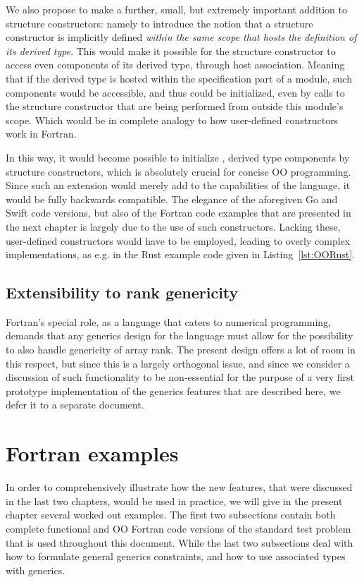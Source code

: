 \documentclass[11pt,oneside]{report}
\newcommand{\code}[1]{{\selectfont\ttfamily{#1}}}
\begin{document}
We also propose to make a further, small, but extremely important
addition to structure constructors: namely to introduce the notion
that a structure constructor is implicitly defined \emph{within the
same scope that hosts the definition of its derived type}. This would
make it possible for the structure constructor to access even
\code{private} components of its derived type, through host
association. Meaning that if the derived type is hosted within the
specification part of a module, such components would be accessible,
and thus could be initialized, even by calls to the structure
constructor that are being performed from outside this module's
scope. Which would be in complete analogy to how user-defined
constructors work in Fortran.

In this way, it would become possible to initialize \code{private},
\code{allocatable} derived type components by structure constructors,
which is absolutely crucial for concise OO programming. Since such an
extension would merely add to the capabilities of the language, it
would be fully backwards compatible. The elegance of the aforegiven
Go and Swift code versions, but also of the Fortran code examples that
are presented in the next chapter is largely due to the use of such
constructors. Lacking these, user-defined constructors would have to
be employed, leading to overly complex implementations, as e.g. in the
Rust example code given in Listing~\ref{lst:OORust}.


\section{Extensibility to rank genericity}

Fortran's special role, as a language that caters to numerical
programming, demands that any generics design for the language must
allow for the possibility to also handle genericity of array rank. The
present design offers a lot of room in this respect, but since this is
a largely orthogonal issue, and since we consider a discussion of such
functionality to be non-essential for the purpose of a very first
prototype implementation of the generics features that are described
here, we defer it to a separate document.


\chapter{Fortran examples}
\label{chapt:fortran_examples}

In order to comprehensively illustrate how the new features, that were
discussed in the last two chapters, would be used in practice, we will
give in the present chapter several worked out examples. The first two
subsections contain both complete functional and OO Fortran code
versions of the standard test problem that is used throughout this
document. While the last two subsections deal with how to formulate
general generics constraints, and how to use associated types with
generics.
\end{document}
